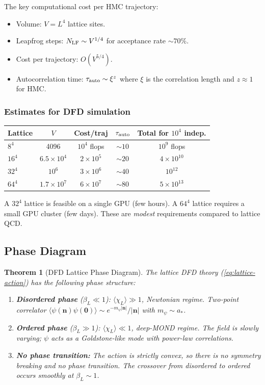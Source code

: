 \documentclass[11pt,a4paper]{article}
\newtheorem{theorem}{Theorem}
\begin{document}
The key computational cost per HMC trajectory:
\begin{itemize}
\item Volume: $V = L^4$ lattice sites.
\item Leapfrog steps: $N_{\rm LF} \sim V^{1/4}$ for acceptance rate $\sim 70\%$.
\item Cost per trajectory: $O(V^{5/4})$.
\item Autocorrelation time: $\tau_{\rm auto} \sim \xi^z$ where $\xi$ is the correlation length and $z \approx 1$ for HMC.
\end{itemize}

\subsubsection{Estimates for DFD simulation}

\begin{center}
\begin{tabular}{lcccc}
\toprule
\textbf{Lattice} & $V$ & \textbf{Cost/traj} & $\tau_{\rm auto}$ & \textbf{Total for $10^4$ indep.} \\
\midrule
$8^4$ & 4096 & $10^4$ flops & $\sim 10$ & $10^9$ flops \\
$16^4$ & $6.5\times10^4$ & $2\times10^5$ & $\sim 20$ & $4\times10^{10}$ \\
$32^4$ & $10^6$ & $3\times10^6$ & $\sim 40$ & $10^{12}$ \\
$64^4$ & $1.7\times10^7$ & $6\times10^7$ & $\sim 80$ & $5\times10^{13}$ \\
\bottomrule
\end{tabular}
\end{center}

A $32^4$ lattice is feasible on a single GPU (few hours). A $64^4$ lattice requires a small GPU cluster (few days). These are \emph{modest} requirements compared to lattice QCD.

\subsection{Phase Diagram}

\begin{theorem}[DFD Lattice Phase Diagram]
The lattice DFD theory (\ref{eq:lattice-action}) has the following phase structure:
\begin{enumerate}
\item \textbf{Disordered phase} ($\beta_L \ll 1$): $\langle\chi_L\rangle \gg 1$, Newtonian regime. Two-point correlator $\langle\psi(\mathbf{n})\psi(\mathbf{0})\rangle \sim e^{-m_\psi|\mathbf{n}|}/|\mathbf{n}|$ with $m_\psi \sim a_*$.
\item \textbf{Ordered phase} ($\beta_L \gg 1$): $\langle\chi_L\rangle \ll 1$, deep-MOND regime. The field is slowly varying; $\psi$ acts as a Goldstone-like mode with power-law correlations.
\item \textbf{No phase transition:} The action is strictly convex, so there is no symmetry breaking and no phase transition. The crossover from disordered to ordered occurs smoothly at $\beta_L \sim 1$.
\end{enumerate}
\end{theorem}
\end{document}
